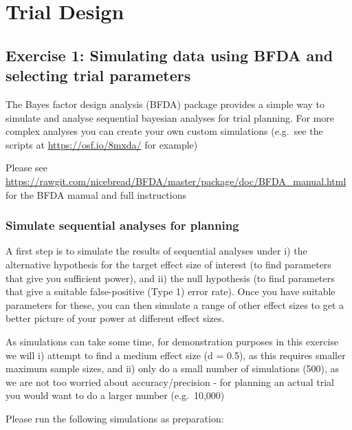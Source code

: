 \documentclass[
]{book}
\begin{document}
\hypertarget{trial-design}{%
\chapter{Trial Design}\label{trial-design}}

\hypertarget{exercise-1-simulating-data-using-bfda-and-selecting-trial-parameters}{%
\section{Exercise 1: Simulating data using BFDA and selecting trial parameters}\label{exercise-1-simulating-data-using-bfda-and-selecting-trial-parameters}}

The Bayes factor design analysis (BFDA) package provides a simple way to simulate and analyse sequential bayesian analyses for trial planning. For more complex analyses you can create your own custom simulations (e.g.~see the scripts at \url{https://osf.io/8mxda/} for example)

Please see \url{https://rawgit.com/nicebread/BFDA/master/package/doc/BFDA_manual.html} for the BFDA manual and full instructions

\hypertarget{simulate-sequential-analyses-for-planning}{%
\subsection{Simulate sequential analyses for planning}\label{simulate-sequential-analyses-for-planning}}

A first step is to simulate the results of sequential analyses under i) the alternative hypothesis for the target effect size of interest (to find parameters that give you sufficient power), and ii) the null hypothesis (to find parameters that give a suitable false-positive (Type 1) error rate). Once you have suitable parameters for these, you can then simulate a range of other effect sizes to get a better picture of your power at different effect sizes.

As simulations can take some time, for demonstration purposes in this exercise we will i) attempt to find a medium effect size (d = 0.5), as this requires smaller maximum sample sizes, and ii) only do a small number of simulations (500), as we are not too worried about accuracy/precision - for planning an actual trial you would want to do a larger number (e.g.~10,000)

Please run the following simulations as preparation:
\end{document}
